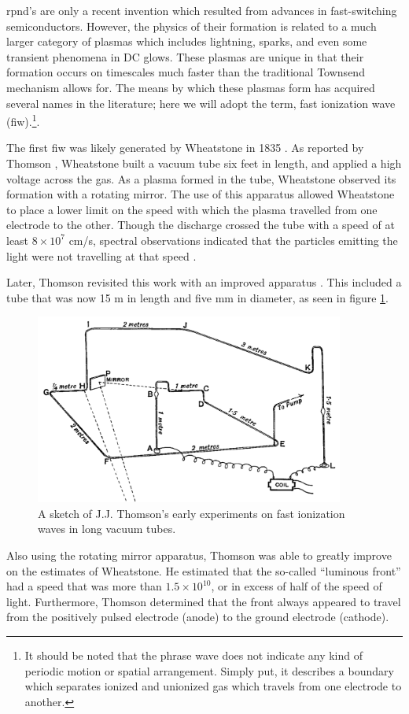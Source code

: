 \acs{rpnd}'s are only a recent invention which resulted from advances in
fast-switching semiconductors. However, the physics of their formation is
related to a much larger category of plasmas which includes lightning, sparks,
and even some transient phenomena in DC glows. These plasmas are unique in that
their formation occurs on timescales much faster than the traditional Townsend
mechanism allows for. The means by which these plasmas form has acquired several
names in the literature; here we will adopt the term, fast ionization wave
(\acs{fiw}).\footnote{It should be noted that the phrase wave does not indicate
any kind of periodic motion or spatial arrangement. Simply put, it describes a
boundary which separates ionized and unionized gas which travels from one
electrode to another.}.

The first \acs{fiw} was likely generated by Wheatstone in 1835
\cite{Wheatstone1835}. As reported by Thomson \cite{Thomson1893}, Wheatstone
built a vacuum tube six feet in length, and applied a high voltage across the
gas. As a plasma formed in the tube, Wheatstone observed its formation with a
rotating mirror. The use of this apparatus allowed Wheatstone to place a lower
limit on the speed with which the plasma travelled from one electrode to the
other. Though the discharge crossed the tube with a speed of at least
$8\times10^7$ cm/s, spectral observations indicated that the particles emitting
the light were not travelling at that speed \cite{Zahn1879}.

Later, Thomson revisited this work with an improved apparatus
\cite{Thomson1893}. This included a tube that was now 15 m in length and five mm
in diameter, as seen in figure \ref{fig:thomson}.
\begin{figure}
  \centering
  \includegraphics[width=4in]{chapters/introduction/figures/thomson.png}
  \caption{A sketch of J.J. Thomson's early experiments on fast ionization
  waves in long vacuum tubes.}\label{fig:thomson}
\end{figure}
Also using the rotating mirror apparatus, Thomson was able to greatly improve on
the estimates of Wheatstone. He estimated that the so-called ``luminous front''
had a speed that was more than $1.5\times10^{10}$, or in excess of half of the
speed of light. Furthermore, Thomson determined that the front always appeared
to travel from the positively pulsed electrode (anode) to the ground electrode
(cathode).

